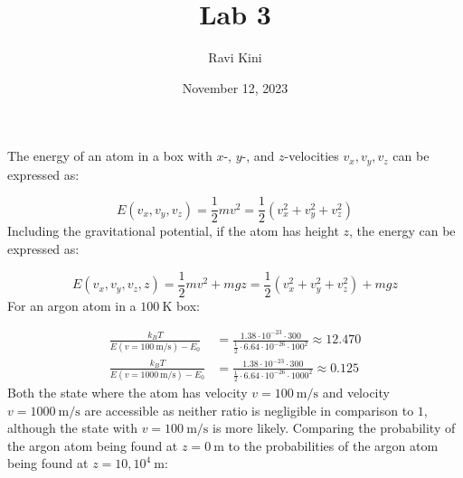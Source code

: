 \documentclass{article}
\title{Lab 3}
\author{Ravi Kini}
\date{November 12, 2023}
\begin{document}
\maketitle


\problem
The energy of an atom in a box with $x$-, $y$-, and $z$-velocities $v_x, v_y, v_z$ can be expressed as:

\begin{equation}
    E(v_x, v_y, v_z) = \frac{1}{2}mv^2 = \frac{1}{2}(v_x^2 + v_y^2 + v_z^2)
\end{equation}
Including the gravitational potential, if the atom has height $z$, the energy can be expressed as:

\begin{equation}
    E(v_x, v_y, v_z, z) = \frac{1}{2}mv^2 + mgz = \frac{1}{2}(v_x^2 + v_y^2 + v_z^2) + mgz
\end{equation}
For an argon atom in a $100~\unit{\kelvin}$ box:

\begin{equation}
    \begin{split}
        \frac{k_B T}{E(v = 100~\unit{\meter\per\second}) - E_0} & = \frac{1.38 \cdot 10^{-23} \cdot 300}{\frac{1}{2} \cdot 6.64 \cdot 10^{-26} \cdot 100^2} \approx 12.470 \\
        \frac{k_B T}{E(v = 1000~\unit{\meter\per\second}) - E_0} & = \frac{1.38 \cdot 10^{-23} \cdot 300}{\frac{1}{2} \cdot 6.64 \cdot 10^{-26} \cdot 1000^2} \approx 0.125
    \end{split}
\end{equation} 
Both the state where the atom has velocity $v = 100~\unit{\meter\per\second}$ and velocity $v = 1000~\unit{\meter\per\second}$ are accessible as neither ratio is negligible in comparison to $1$, although the state with $v = 100~\unit{\meter\per\second}$ is more likely. Comparing the probability of the argon atom being found at $z = 0~\unit{\meter}$ to the probabilities of the argon atom being found at $z = 10, 10^4~\unit{\meter}$:
\end{document}
